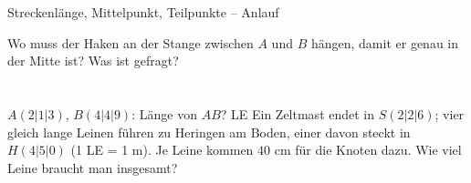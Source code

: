 \begin{aufgabe}{Streckenlänge, Mittelpunkt, Teilpunkte – Anlauf}
\begin{teile}
\teil Wo muss der Haken an der Stange zwischen $A$ und $B$ hängen, damit er genau in der Mitte ist? Was ist gefragt? \\  \\  \\ 
\teil $A(2 | 1 | 3)$, $B(4 | 4 | 9)$: Länge von $AB$? \leerfeld LE
\teil Ein Zeltmast endet in $S(2 | 2 | 6)$; vier gleich lange Leinen führen zu Heringen am Boden, einer davon steckt in $H(4 | 5 | 0)$ (1 LE = 1 m). Je Leine kommen $40$ cm für die Knoten dazu. Wie viel Leine braucht man insgesamt? \leerfeld[m]
\end{teile}
\end{aufgabe}

